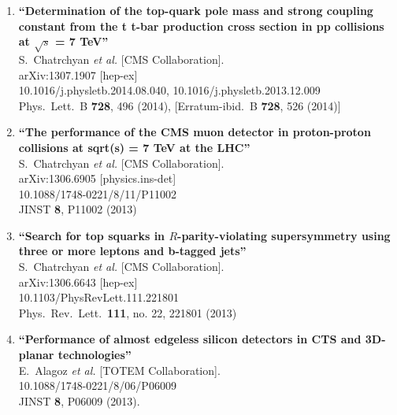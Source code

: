 \documentclass{article}
\begin{document}
\begin{enumerate}
\item%
{\bf ``Determination of the top-quark pole mass and strong coupling constant from the t t-bar production cross section in pp collisions at $\sqrt{s}$ = 7 TeV''}
  \\{}S.~Chatrchyan {\it et al.}  [CMS Collaboration].
  \\{}arXiv:1307.1907 [hep-ex]
    \\{}10.1016/j.physletb.2014.08.040, 10.1016/j.physletb.2013.12.009
\\{}Phys.\ Lett.\ B {\bf 728}, 496 (2014), [Erratum-ibid.\ B {\bf 728}, 526 (2014)] %


\item%
{\bf ``The performance of the CMS muon detector in proton-proton collisions at sqrt(s) = 7 TeV at the LHC''}
  \\{}S.~Chatrchyan {\it et al.}  [CMS Collaboration].
  \\{}arXiv:1306.6905 [physics.ins-det]
    \\{}10.1088/1748-0221/8/11/P11002
\\{}JINST {\bf 8}, P11002 (2013) %


\item%
{\bf ``Search for top squarks in $R$-parity-violating supersymmetry using three or more leptons and b-tagged jets''}
  \\{}S.~Chatrchyan {\it et al.}  [CMS Collaboration].
  \\{}arXiv:1306.6643 [hep-ex]
    \\{}10.1103/PhysRevLett.111.221801
\\{}Phys.\ Rev.\ Lett.\  {\bf 111}, no. 22, 221801 (2013) %


\item%
{\bf ``Performance of almost edgeless silicon detectors in CTS and 3D-planar technologies''}
  \\{}E.~Alagoz {\it et al.}  [TOTEM Collaboration].
    \\{}10.1088/1748-0221/8/06/P06009
\\{}JINST {\bf 8}, P06009 (2013). %



\end{enumerate}
\end{document}

